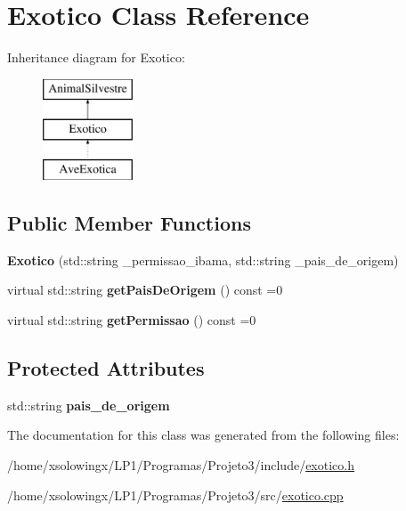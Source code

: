 \hypertarget{classExotico}{}\section{Exotico Class Reference}
\label{classExotico}
Inheritance diagram for Exotico\+:\begin{figure}[H]
\begin{center}
\leavevmode
\includegraphics[height=3.000000cm]{classExotico}
\end{center}
\end{figure}
\subsection*{Public Member Functions}
\begin{DoxyCompactItemize}
\item 
\mbox{\label{classExotico_a810d1ec34106e9c2ec6b725af40bcdbf}} 
{\bfseries Exotico} (std\+::string \+\_\+permissao\+\_\+ibama, std\+::string \+\_\+pais\+\_\+de\+\_\+origem)
\item 
\mbox{\label{classExotico_ae0ee8fb011ca22acd674ac8fcf8917dd}} 
virtual std\+::string {\bfseries get\+Pais\+De\+Origem} () const =0
\item 
\mbox{\label{classExotico_a3fa36660107b1af74272a7ae0f297239}} 
virtual std\+::string {\bfseries get\+Permissao} () const =0
\end{DoxyCompactItemize}
\subsection*{Protected Attributes}
\begin{DoxyCompactItemize}
\item 
\mbox{\label{classExotico_ae1a8fad5cd213e89fff278c4a928f169}} 
std\+::string {\bfseries pais\+\_\+de\+\_\+origem}
\end{DoxyCompactItemize}


The documentation for this class was generated from the following files\+:\begin{DoxyCompactItemize}
\item 
/home/xsolowingx/\+L\+P1/\+Programas/\+Projeto3/include/\hyperlink{exotico_8h}{exotico.\+h}\item 
/home/xsolowingx/\+L\+P1/\+Programas/\+Projeto3/src/\hyperlink{exotico_8cpp}{exotico.\+cpp}\end{DoxyCompactItemize}
